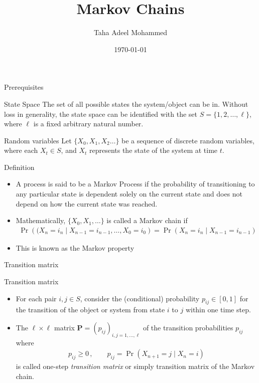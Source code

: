\documentclass{beamer}
\title{Markov Chains}
\author{Taha Adeel Mohammed}
\institute{IITH(CSE)}
\date{\today}
\providecommand{\pr}[1]{\ensuremath{\Pr\left(#1\right)}}
\begin{document}
%
\begin{frame}
\titlepage
\end{frame}
\begin{frame}{Prerequisites}
\begin{block}{State Space}
The set of all possible states the system/object can be in. Without loss in generality, the state space can be identified with the set $S=\{ 1,2,\dots,\ell\}$, where $\ell$ is a fixed arbitrary natural number.
\end{block}
\begin{block}{Random variables}
Let $\{ X_0,X_1,X_2\dots\}$ be a sequence of discrete random variables, where each $X_t \in S$, and $X_t$ represents the state of the system at time $t$.
\end{block}
\end{frame}
\begin{frame}{Definition}
\begin{itemize}
    \item A process is said to be a Markov Process if the probability of transitioning to any particular state is dependent solely on the current state and does not depend on how the current state was reached.
    \item Mathematically, $ \{X_0,X_1,\ldots\}$ is called a  Markov chain if 
\begin{align}
    \pr{(X_{n}=i_n\mid X_{n-1}=i_{n-1},\ldots,X_0=i_{0}}= \pr{X_{n}=i_n\mid X_{n-1}=i_{n-1}}
\end{align}
\item This is known as the Markov property
\end{itemize}
\end{frame}
\begin{frame}{Transition matrix}
    \begin{block}{Transition matrix}
    \begin{itemize}
        \item  For each pair $ i,j\in S$, consider the (conditional) probability $ p_{ij}\in[0,1]$ for the transition of the object or system from state $ i$ to $ j$ within one time step.
        \item The $ \ell\times\ell$ matrix $ {\mathbf{P}}=(p_{ij})_{i,j=1,\ldots,\ell}$ of the transition probabilities $ p_{ij}$ where
        \begin{align}
            p_{ij}\ge0\,,\qquad p_{ij}=\pr{X_{n+1}=j\mid X_{n}=i}	
        \end{align}
        is called one-step \textit{transition matrix} or simply transition matrix of the Markov chain.
    \end{itemize}
    \end{block}
\end{frame}
\end{document}

